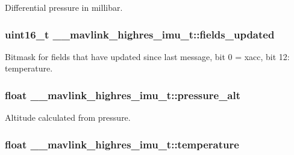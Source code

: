 Differential pressure in millibar. 

\hypertarget{struct____mavlink__highres__imu__t_a0723ff71a7057f3f96eb64ac73be64dc}{
\subsubsection[{fields\+\_\+updated}]{\setlength{\rightskip}{0pt plus 5cm}uint16\+\_\+t \+\_\+\+\_\+mavlink\+\_\+highres\+\_\+imu\+\_\+t\+::fields\+\_\+updated}}\label{struct____mavlink__highres__imu__t_a0723ff71a7057f3f96eb64ac73be64dc}


Bitmask for fields that have updated since last message, bit 0 = xacc, bit 12\+: temperature. 

\hypertarget{struct____mavlink__highres__imu__t_ae540d0d0572455b1fc44123d3a3b6405}{
\subsubsection[{pressure\+\_\+alt}]{\setlength{\rightskip}{0pt plus 5cm}float \+\_\+\+\_\+mavlink\+\_\+highres\+\_\+imu\+\_\+t\+::pressure\+\_\+alt}}\label{struct____mavlink__highres__imu__t_ae540d0d0572455b1fc44123d3a3b6405}


Altitude calculated from pressure. 

\hypertarget{struct____mavlink__highres__imu__t_add75673ef20a41e9548b3b583762d4b4}{
\subsubsection[{temperature}]{\setlength{\rightskip}{0pt plus 5cm}float \+\_\+\+\_\+mavlink\+\_\+highres\+\_\+imu\+\_\+t\+::temperature}}\label{struct____mavlink__highres__imu__t_add75673ef20a41e9548b3b583762d4b4}


